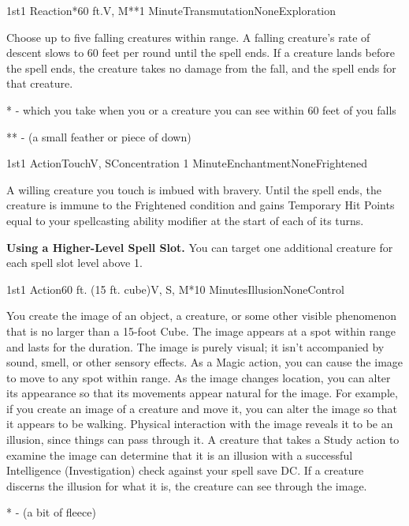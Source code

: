\begin{Spell}{1st}{1 Reaction*}{60 ft.}{V, M**}{1 Minute}{Transmutation}{None}{Exploration}

Choose up to five falling creatures within range. A falling creature's rate of descent slows to 60 feet per round until the spell ends. If a creature lands before the spell ends, the creature takes no damage from the fall, and the spell ends for that creature.

* - which you take when you or a creature you can see within 60 feet of you falls

** - (a small feather or piece of down)
\end{Spell}

\begin{Spell}{1st}{1 Action}{Touch}{V, S}{Concentration 1 Minute}{Enchantment}{None}{Frightened}

A willing creature you touch is imbued with bravery. Until the spell ends, the creature is immune to the Frightened condition and gains Temporary Hit Points equal to your spellcasting ability modifier at the start of each of its turns.

\textbf{Using a Higher-Level Spell Slot.} You can target one additional creature for each spell slot level above 1.
\end{Spell}


\begin{Spell}{1st}{1 Action}{60 ft. (15 ft. cube)}{V, S, M*}{10 Minutes}{Illusion}{None}{Control}

You create the image of an object, a creature, or some other visible phenomenon that is no larger than a 15-foot Cube. The image appears at a spot within range and lasts for the duration. The image is purely visual; it isn't accompanied by sound, smell, or other sensory effects. As a Magic action, you can cause the image to move to any spot within range. As the image changes location, you can alter its appearance so that its movements appear natural for the image. For example, if you create an image of a creature and move it, you can alter the image so that it appears to be walking.
Physical interaction with the image reveals it to be an illusion, since things can pass through it. A creature that takes a Study action to examine the image can determine that it is an illusion with a successful Intelligence (Investigation) check against your spell save DC. If a creature discerns the illusion for what it is, the creature can see through the image.

* - (a bit of fleece)
\end{Spell}

